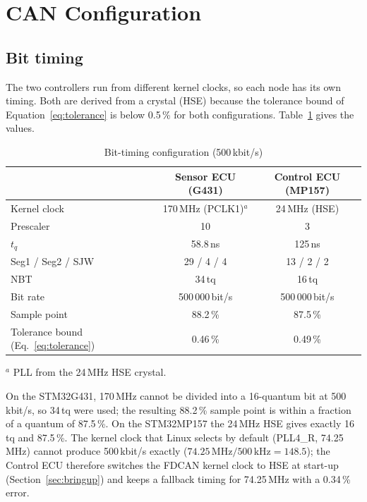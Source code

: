 \section{CAN Configuration}

\subsection{Bit timing}

The two controllers run from different kernel clocks, so each node has its own timing. Both are derived from a crystal (HSE) because the tolerance bound of Equation~\ref{eq:tolerance} is below 0.5\,\% for both configurations. Table~\ref{tab:bittiming} gives the values.

\begin{table}[H]
\centering
\small
\caption{Bit-timing configuration (500\,kbit/s)}
\label{tab:bittiming}
\begin{tabular}{@{}lcc@{}}
\toprule
 & \textbf{Sensor ECU (G431)} & \textbf{Control ECU (MP157)} \\
\midrule
Kernel clock & 170\,MHz (PCLK1)$^{a}$ & 24\,MHz (HSE) \\
Prescaler & 10 & 3 \\
$t_q$ & 58.8\,ns & 125\,ns \\
Seg1 / Seg2 / SJW & 29 / 4 / 4 & 13 / 2 / 2 \\
NBT & 34\,tq & 16\,tq \\
Bit rate & 500\,000\,bit/s & 500\,000\,bit/s \\
Sample point & 88.2\,\% & 87.5\,\% \\
Tolerance bound (Eq.~\ref{eq:tolerance}) & 0.46\,\% & 0.49\,\% \\
\bottomrule
\end{tabular}

{\footnotesize $^{a}$ PLL from the 24\,MHz HSE crystal.}
\end{table}

On the STM32G431, 170\,MHz cannot be divided into a 16-quantum bit at 500\,kbit/s, so 34\,tq were used; the resulting 88.2\,\% sample point is within a fraction of a quantum of 87.5\,\%. On the STM32MP157 the 24\,MHz HSE gives exactly 16\,tq and 87.5\,\%. The kernel clock that Linux selects by default (PLL4\_R, 74.25\,MHz) cannot produce 500\,kbit/s exactly ($74.25\,\text{MHz}/500\,\text{kHz} = 148.5$); the Control ECU therefore switches the FDCAN kernel clock to HSE at start-up (Section~\ref{sec:bringup}) and keeps a fallback timing for 74.25\,MHz with a 0.34\,\% error.


